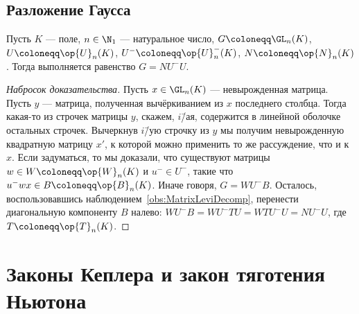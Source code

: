 \documentclass[
	extrafontsizes,
	11pt,
	hyphens,
]{memoir}
\begin{document}
\subsection{Разложение Гаусса}

\begin{theorem}
Пусть \(K\) --- поле, \(n \in \N_1\) --- натуральное число,
\(G \coloneqq \GL_n(K)\), \(U \coloneqq \op{U}_n(K)\), \(U^{-} \coloneqq \op{U}^{-}_n(K)\), \(N \coloneqq \op{N}_n(K)\).
Тогда выполняется равенство \(G = N U^{-} U\).
\end{theorem}

\begin{proof}[Набросок доказательства]
Пусть \(x \in \GL_n(K)\) --- невырожденная матрица.
Пусть \(y\) --- матрица, полученная вычёркиванием из \(x\) последнего столбца.
Тогда какая-то из строчек матрицы \(y\), скажем, \(i\)\=/ая, содержится в линейной оболочке остальных строчек.
Вычеркнув \(i\)\=/ую строчку из \(y\) мы получим невырожденную квадратную матрицу \(x'\), к которой можно применить то же рассуждение, что и к \(x\).
Если задуматься, то мы доказали, что существуют матрицы \(w \in W \coloneqq \op{W}_n(K)\) и \(u^{-} \in U^{-}\), такие что \(u^{-} w x \in B \coloneqq \op{B}_n(K)\).
Иначе говоря, \(G = W U^{-} B\).
Осталось, воспользовавшись наблюдением~\ref{obs:MatrixLeviDecomp}, перенести диагональную компоненту \(B\) налево:
\(W U^{-} B = W U^{-} T U = W T U^{-} U = N U^{-} U\), где \(T \coloneqq \op{T}_n(K)\).
\end{proof}


\section{Законы Кеплера и закон тяготения Ньютона}


\end{document}
